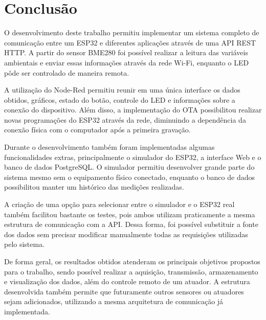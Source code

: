 \vspace{5mm}
\section{Conclusão}

O desenvolvimento deste trabalho permitiu implementar um sistema completo de comunicação entre um ESP32 e diferentes aplicações através de uma API REST HTTP. A partir do sensor BME280 foi possível realizar a leitura das variáveis ambientais e enviar essas informações através da rede Wi-Fi, enquanto o LED pôde ser controlado de maneira remota.

A utilização do Node-Red permitiu reunir em uma única interface os dados obtidos, gráficos, estado do botão, controle do LED e informações sobre a conexão do dispositivo. Além disso, a implementação do OTA possibilitou realizar novas programações do ESP32 através da rede, diminuindo a dependência da conexão física com o computador após a primeira gravação.

Durante o desenvolvimento também foram implementadas algumas funcionalidades extras, principalmente o simulador do ESP32, a interface Web e o banco de dados PostgreSQL. O simulador permitiu desenvolver grande parte do sistema mesmo sem o equipamento físico conectado, enquanto o banco de dados possibilitou manter um histórico das medições realizadas.

A criação de uma opção para selecionar entre o simulador e o ESP32 real também facilitou bastante os testes, pois ambos utilizam praticamente a mesma estrutura de comunicação com a API. Dessa forma, foi possível substituir a fonte dos dados sem precisar modificar manualmente todas as requisições utilizadas pelo sistema.

De forma geral, os resultados obtidos atenderam os principais objetivos propostos para o trabalho, sendo possível realizar a aquisição, transmissão, armazenamento e visualização dos dados, além do controle remoto de um atuador. A estrutura desenvolvida também permite que futuramente outros sensores ou atuadores sejam adicionados, utilizando a mesma arquitetura de comunicação já implementada.

